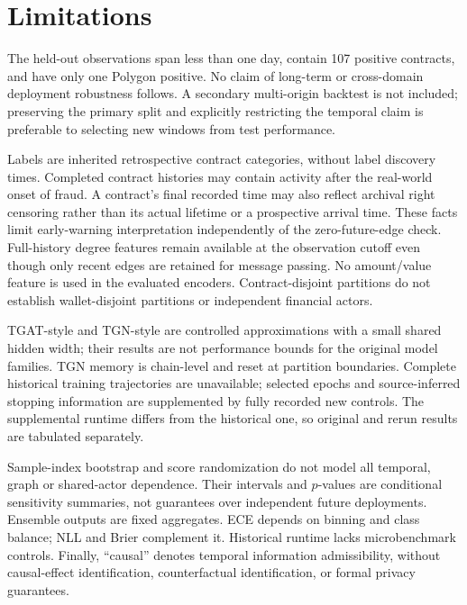 \documentclass[applsci,article,submit,pdftex,moreauthors]{Definitions/mdpi}
\begin{document}
\section{Limitations}
The held-out observations span less than one day, contain 107 positive contracts, and have only one Polygon positive. No claim of long-term or cross-domain deployment robustness follows. A secondary multi-origin backtest is not included; preserving the primary split and explicitly restricting the temporal claim is preferable to selecting new windows from test performance.

Labels are inherited retrospective contract categories, without label discovery times. Completed contract histories may contain activity after the real-world onset of fraud. A contract's final recorded time may also reflect archival right censoring rather than its actual lifetime or a prospective arrival time. These facts limit early-warning interpretation independently of the zero-future-edge check. Full-history degree features remain available at the observation cutoff even though only recent edges are retained for message passing. No amount/value feature is used in the evaluated encoders. Contract-disjoint partitions do not establish wallet-disjoint partitions or independent financial actors.

TGAT-style and TGN-style are controlled approximations with a small shared hidden width; their results are not performance bounds for the original model families. TGN memory is chain-level and reset at partition boundaries. Complete historical training trajectories are unavailable; selected epochs and source-inferred stopping information are supplemented by fully recorded new controls. The supplemental runtime differs from the historical one, so original and rerun results are tabulated separately.

Sample-index bootstrap and score randomization do not model all temporal, graph or shared-actor dependence. Their intervals and $p$-values are conditional sensitivity summaries, not guarantees over independent future deployments. Ensemble outputs are fixed aggregates. ECE depends on binning and class balance; NLL and Brier complement it. Historical runtime lacks microbenchmark controls. Finally, ``causal'' denotes temporal information admissibility, without causal-effect identification, counterfactual identification, or formal privacy guarantees.
\end{document}
